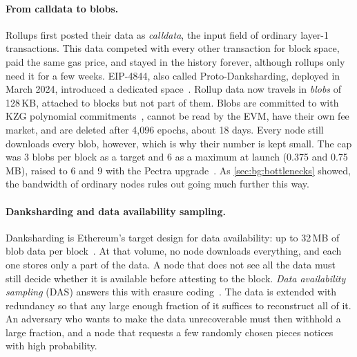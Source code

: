 \paragraph{From calldata to blobs.}
Rollups first posted their data as \emph{calldata}, the input field of ordinary layer-1 transactions.
This data competed with every other transaction for block space, paid the same gas price, and stayed in the history forever, although rollups only need it for a few weeks.
EIP-4844, also called Proto-Danksharding, deployed in March 2024, introduced a dedicated space~\cite{eip4844}.
Rollup data now travels in \emph{blobs} of 128\,KB, attached to blocks but not part of them.
Blobs are committed to with KZG polynomial commitments~\cite{kate2010kzg}, cannot be read by the EVM, have their own fee market, and are deleted after 4{,}096 epochs, about 18 days.
Every node still downloads every blob, however, which is why their number is kept small.
The cap was 3 blobs per block as a target and 6 as a maximum at launch (0.375 and 0.75\,MB), raised to 6 and 9 with the Pectra upgrade~\cite{eip7691}. 
As \autoref{sec:bg:bottlenecks} showed, the bandwidth of ordinary nodes rules out going much further this way.

\paragraph{Danksharding and data availability sampling.}
Danksharding is Ethereum's target design for data availability: up to 32\,MB of blob data per block~\cite{ethdanksharding}.
At that volume, no node downloads everything, and each one stores only a part of the data.
A node that does not see all the data must still decide whether it is available before attesting to the block.
\emph{Data availability sampling} (DAS) answers this with erasure coding~\cite{albassam2021fraud}.
The data is extended with redundancy so that any large enough fraction of it suffices to reconstruct all of it.
An adversary who wants to make the data unrecoverable must then withhold a large fraction, and a node that requests a few randomly chosen pieces notices with high probability.

